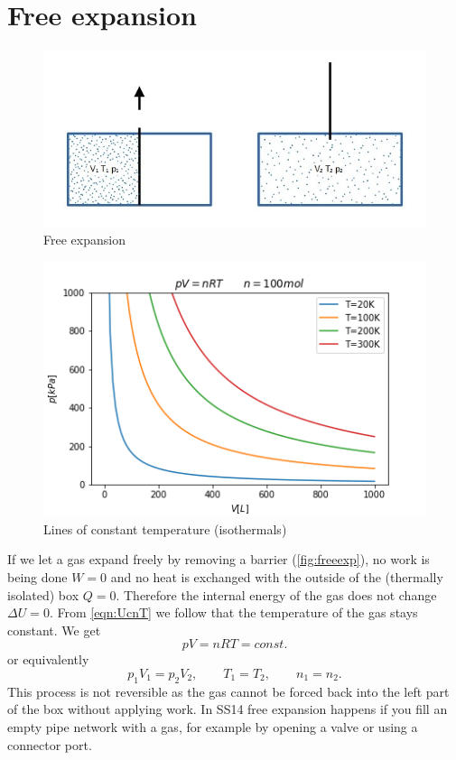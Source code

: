 \documentclass[12pt,a4paper]{article}
\numberwithin{equation}{section}
\begin{document}
\section{Free expansion}
\begin{figure}[h]
\centering
\includegraphics[scale=0.8]{image1}
\caption{Free expansion}
\label{fig:freeexp}
\end{figure}

\begin{figure}[h]
\centering
\includegraphics[scale=0.6]{plot1}
\caption{Lines of constant temperature (isothermals)}\label{fig:isothermalexp}
\end{figure}

If we let a gas expand freely by removing a barrier (\autoref{fig:freeexp}), no work is being done $W=0$ and no heat is exchanged with the outside of the (thermally isolated) box $Q=0$. Therefore the internal energy of the gas does not change $\Delta U = 0$. From \ref{eqn:UcnT} we follow that the temperature of the gas stays constant. We get
\begin{equation}
pV=nRT=const.
\end{equation}
or equivalently
\begin{equation}
p_1 V_1 =p_2 V_2, \qquad T_1=T_2, \qquad n_1=n_2.
\end{equation}
This process is not reversible as the gas cannot be forced back into the left part of the box without applying work.
In SS14 free expansion happens if you fill an empty pipe network with a gas, for example by opening a valve or using a connector port.
\newpage
\end{document}
